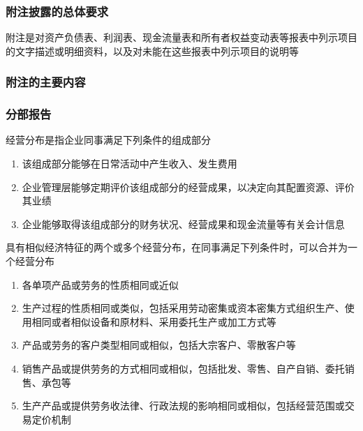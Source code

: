 \documentclass[UTF8,12pt]{ctexart}
\numberwithin{equation}{section} %
\numberwithin{figure}{section}
\numberwithin{table}{section}
\begin{document}
	\subsubsection{附注披露的总体要求}
	附注是对资产负债表、利润表、现金流量表和所有者权益变动表等报表中列示项目的文字描述或明细资料，以及对未能在这些报表中列示项目的说明等
	\subsubsection{附注的主要内容}
	\subsubsection{分部报告}
	经营分布是指企业同事满足下列条件的组成部分
	\begin{enumerate}
		\item 该组成部分能够在日常活动中产生收入、发生费用
		
		\item 企业管理层能够定期评价该组成部分的经营成果，以决定向其配置资源、评价其业绩
		
		\item 企业能够取得该组成部分的财务状况、经营成果和现金流量等有关会计信息
	\end{enumerate}
	
	具有相似经济特征的两个或多个经营分布，在同事满足下列条件时，可以合并为一个经营分布
	\begin{enumerate}
		\item 各单项产品或劳务的性质相同或近似
		
		\item 生产过程的性质相同或类似，包括采用劳动密集或资本密集方式组织生产、使用相同或者相似设备和原材料、采用委托生产或加工方式等
		
		\item 产品或劳务的客户类型相同或相似，包括大宗客户、零散客户等
		
		\item 销售产品或提供劳务的方式相同或相似，包括批发、零售、自产自销、委托销售、承包等
		
		\item 生产产品或提供劳务收法律、行政法规的影响相同或相似，包括经营范围或交易定价机制
	\end{enumerate}
	
\end{document}
